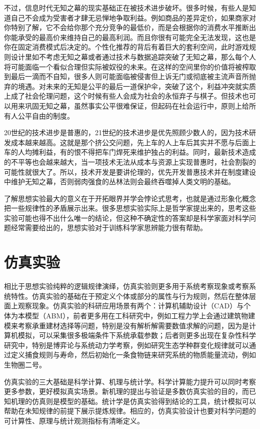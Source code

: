\documentclass[]{tufte-book}
\begin{document}
不过，信息时代无知之幕的现实基础正在被技术进步破坏。很多时候，有些人是知道自己不会成为受害者才肆无忌惮地争取利益。例如商品的差异定价，如果商家对你特别了解，它不会给你那个充分竞争的最低价，而是会根据你的消费水平推断出你能承受的最高价来维持自己的最高利润。而且你很有可能完全无法发现，这也是你在固定消费模式后决定的。个性化推荐的背后有着巨大的套利空间，此时游戏规则设计里如不考虑无知之幕或者通过技术与数据追踪突破了无知之幕，那么每个人将可能面临一个看似合理但实际被奴役的未来。在这样的空间里你的价值将被榨取到最后一滴而不自知，很多人则可能面临被侵害但上诉无门或彻底被主流声音所抛弃的境遇。对未来的无知是公平的最后一道保护伞，突破了这个，利益冲突就实质上成了社会伦理问题，这个时候有些人会成为社会的永恒弃子与棋子。但技术也可以用来巩固无知之幕，虽然事实公平很难保证，但起码在社会运行中，原则上给所有人公平自由的制度。

20世纪的技术进步是普惠的，21世纪的技术进步是优先照顾少数人的，因为技术研发成本越来越高。这就是那个挤公交问题，先上车的人上车后其实并不愿与后面上车的人均摊利益，有的恨不得把车门焊死来维护独占的利益。同时，最新技术造成的不平等也会越来越大，当一项技术无法从成本与资源上实现普惠时，社会割裂的可能性就很大了。所以，技术开发是要讲伦理的，优先开发普惠技术并在制度建设中维护无知之幕，否则弱肉强食的丛林法则会最终吞噬掉人类文明的基础。

了解思想实验最大的意义在于开拓眼界并学会悖论式思考，也就是通过形象化概念把一些规律性的矛盾展示出来。很多思想实验实际上是哲学家提出来的，思考这些实验可能也得不出什么唯一的结论，但这种不确定性的答案却是科学家面对科学问题经常需要给出的，思想实验对于训练科学家思辨能力很有帮助。

\hypertarget{ux4effux771fux5b9eux9a8c}{%
\section{仿真实验}\label{ux4effux771fux5b9eux9a8c}}

相比于思想实验纯粹的逻辑规律演绎，仿真实验则更多用于系统考察现象或考察系统特性。仿真实验的基础在于预定义个体或部分的属性与行为规则，然后在整体层面上观察现象。仿真实验的科研应用场景有两个：计算机辅助设计（CAD）与个体为本模型（ABM），前者更多用在工科研究中，例如工程力学上会通过建筑物建模来考察承重建材选择等问题，特别是没有解析解需要数值求解的问题，因为是计算机模拟，可以采集很多极端条件下系统承载参数；后者则更多出现在复杂性科学研究中，特别是博弈论与系统动力学考察，例如研究生态学种群变化规律就可以通过定义捕食规则与寿命，然后初始化一条食物链来研究系统的物质能量流动，例如生物圈二号。

仿真实验的三大基础是科学计算、机理与统计学。科学计算能力提升可以同时考察更多参数，更好模拟真实场景。新机理的提出与验证是多数仿真实验的目的，而已知机理的仿真则是模型的基础。统计学是仿真实验得到结论的工具，统计模拟可以帮助在未知规律的前提下展示提炼规律。相应的，仿真实验设计也要对科学问题的可计算性、原理与统计观测指标有清晰定义。
\end{document}
